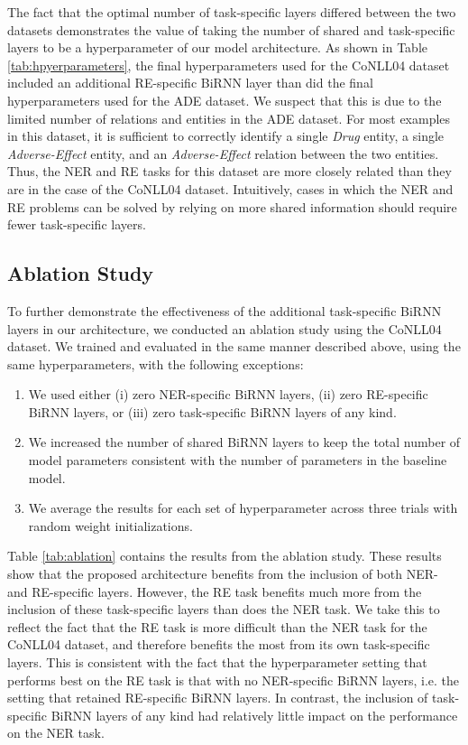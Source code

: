 \documentclass{article}
\begin{document}
The fact that the optimal number of task-specific layers differed between the two datasets demonstrates the value of taking the number of shared and task-specific layers to be a hyperparameter of our model architecture. As shown in Table \ref{tab:hpyerparameters}, the final hyperparameters used for the CoNLL04 dataset included an additional RE-specific BiRNN layer than did the final hyperparameters used for the ADE dataset. We suspect that this is due to the limited number of relations and entities in the ADE dataset. For most examples in this dataset, it is sufficient to correctly identify a single {\em Drug} entity, a single {\em Adverse-Effect} entity, and an {\em Adverse-Effect} relation between the two entities. Thus, the NER and RE tasks for this dataset are more closely related than they are in the case of the CoNLL04 dataset. Intuitively, cases in which the NER and RE problems can be solved by relying on more shared information should require fewer task-specific layers. 

\subsection{Ablation Study}

To further demonstrate the effectiveness of the additional task-specific BiRNN layers in our architecture, we conducted an ablation study using the CoNLL04 dataset. We trained and evaluated in the same manner described above, using the same hyperparameters, with the following exceptions:
\begin{enumerate}
    \item We used either (i) zero NER-specific BiRNN layers, (ii) zero RE-specific BiRNN layers, or (iii) zero task-specific BiRNN layers of any kind.
    \item We increased the number of shared BiRNN layers to keep the total number of model parameters consistent with the number of parameters in the baseline model.
    \item We average the results for each set of hyperparameter across three trials with random weight initializations. 
\end{enumerate}

Table \ref{tab:ablation} contains the results from the ablation study. These results show that the proposed architecture benefits from the inclusion of both NER- and RE-specific layers. However, the RE task benefits much more from the inclusion of these task-specific layers than does the NER task. We take this to reflect the fact that the RE task is more difficult than the NER task for the CoNLL04 dataset, and therefore benefits the most from its own task-specific layers.  This is consistent with the fact that the hyperparameter setting that performs best on the RE task is that with no NER-specific BiRNN layers, i.e. the setting that retained RE-specific BiRNN layers. In contrast, the inclusion of task-specific BiRNN layers of any kind had relatively little impact on the performance on the NER task. 
\end{document}
